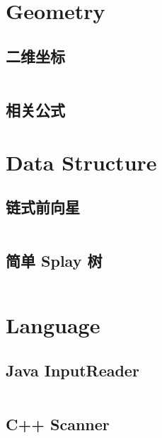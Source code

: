 \documentclass[titlepage, a4paper, 9pt]{article}
\begin{document}
	\begin{titlepage}
		
		\newpage
	\end{titlepage}
	\begin{multicols}{2}
		\setcounter{tocdepth}{2}
		\begingroup
		\let\cleardoublepage\relax
		\let\clearpage\relax
		\tableofcontents
		\newpage
        \begin{spacing}{0.6}
            
			\section{Geometry}
				\subsection{二维坐标}
				\inputminted{cpp}{src/Geometry/二维坐标.cpp}
				\subsection{相关公式}
                
                
            \section{Data Structure}
                \subsection{链式前向星}
                \inputminted{cpp}{src/DataStructure/链式前向星.cpp}
                \subsection{简单 Splay 树}
                \inputminted{cpp}{src/DataStructure/简单 Splay 树.cpp}

            \section{Language}
                \subsection{Java InputReader}
                \inputminted{cpp}{src/Language/InputReader.java}
                \subsection{C++ Scanner}
                \inputminted{cpp}{src/Language/Scanner.cpp}    

\end{spacing}
\end{multicols}
\end{document}

